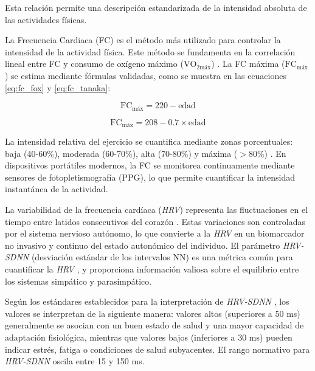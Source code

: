 Esta relación permite una descripción estandarizada de la intensidad absoluta de las actividades físicas.

La Frecuencia Cardiaca (FC) es el método más utilizado para controlar la intensidad de la actividad física. Este método se fundamenta en la correlación lineal entre FC y consumo de oxígeno máximo ($\mathrm{VO}_{2\text{máx}}$) \cite{Abellan2014Prescripcion}. La FC máxima ($\text{FC}_{\text{máx}}$) se estima mediante fórmulas validadas, como se muestra en las ecuaciones \ref{eq:fc_fox} y \ref{eq:fc_tanaka}:

\begin{equation}
\text{FC}_{\text{máx}} = 220 - \text{edad}
\label{eq:fc_fox}
\end{equation}

\begin{equation}
\text{FC}_{\text{máx}} = 208 - 0.7 \times \text{edad}
\label{eq:fc_tanaka}
\end{equation}

La intensidad relativa del ejercicio se cuantifica mediante zonas porcentuales: baja (40-60\%), moderada (60-70\%), alta (70-80\%) y máxima ($>$80\%) \cite{Fox1968Physical,Tanaka2001AgePredicted,Abellan2014Prescripcion}. En dispositivos portátiles modernos, la FC se monitorea continuamente mediante sensores de fotopletismografía (PPG), lo que permite cuantificar la intensidad instantánea de la actividad.

La variabilidad de la frecuencia cardíaca (\textit{HRV}) representa las fluctuaciones en el tiempo entre latidos consecutivos del corazón \cite{TaskForce1996,Quigley2024Publication}. Estas variaciones son controladas por el sistema nervioso autónomo, lo que convierte a la \textit{HRV} en un biomarcador no invasivo y continuo del estado autonómico del individuo. El parámetro \textit{HRV-SDNN} (desviación estándar de los intervalos NN) es una métrica común para cuantificar la \textit{HRV} \cite{Damoun2024HRV,Laborde2017}, y proporciona información valiosa sobre el equilibrio entre los sistemas simpático y parasimpático.

Según los estándares establecidos para la interpretación de \textit{HRV-SDNN} \cite{Damoun2024HRV,TaskForce1996}, los valores se interpretan de la siguiente manera: valores altos (superiores a 50 ms) generalmente se asocian con un buen estado de salud y una mayor capacidad de adaptación fisiológica, mientras que valores bajos (inferiores a 30 ms) pueden indicar estrés, fatiga o condiciones de salud subyacentes. El rango normativo para \textit{HRV-SDNN} oscila entre 15 y 150 ms.

